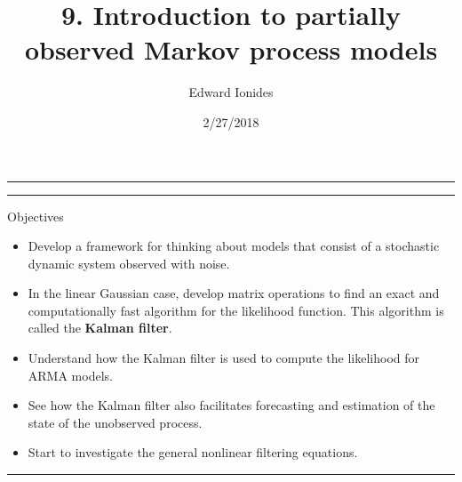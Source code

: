 \documentclass[]{article}
\title{9. Introduction to partially observed Markov process models}
\author{Edward Ionides}
\date{2/27/2018}
\begin{document}
\maketitle

{
\setcounter{tocdepth}{2}
\tableofcontents
}
\newcommand\prob{\mathbb{P}}
\newcommand\E{\mathbb{E}}
\newcommand\var{\mathrm{Var}}
\newcommand\cov{\mathrm{Cov}}
\newcommand\loglik{\ell}
\newcommand\R{\mathbb{R}}
\newcommand\data[1]{#1^*}
\newcommand\params{\, ; \,}
\newcommand\transpose{\scriptsize{T}}
\newcommand\eqspace{\quad\quad}
\newcommand\myeq[1]{\eqspace \displaystyle #1}
\newcommand\lik{\mathscr{L}}
\newcommand\profileloglik[1]{\ell^\mathrm{profile}_#1}
\newcommand\ar{\phi}
\newcommand\ma{\psi}
\newcommand\AR{\Phi}
\newcommand\MA{\Psi}
\newcommand\ev{u}
\newcommand\given{{\, | \,}}
\newcommand\equals{{=\,}}
\newcommand\matA{\mathbb{A}}
\newcommand\matB{\mathbb{B}}
\newcommand\matH{\mathbb{H}}
\newcommand\covmatX{\mathbb{U}}
\newcommand\covmatY{\mathbb{V}}





\begin{center}\rule{0.5\linewidth}{\linethickness}\end{center}

\begin{center}\rule{0.5\linewidth}{\linethickness}\end{center}

Objectives

\begin{itemize}
\item
  Develop a framework for thinking about models that consist of a
  stochastic dynamic system observed with noise.
\item
  In the linear Gaussian case, develop matrix operations to find an
  exact and computationally fast algorithm for the likelihood function.
  This algorithm is called the \textbf{Kalman filter}.
\item
  Understand how the Kalman filter is used to compute the likelihood for
  ARMA models.
\item
  See how the Kalman filter also facilitates forecasting and estimation
  of the state of the unobserved process.
\item
  Start to investigate the general nonlinear filtering equations.
\end{itemize}

\begin{center}\rule{0.5\linewidth}{\linethickness}\end{center}
\end{document}
